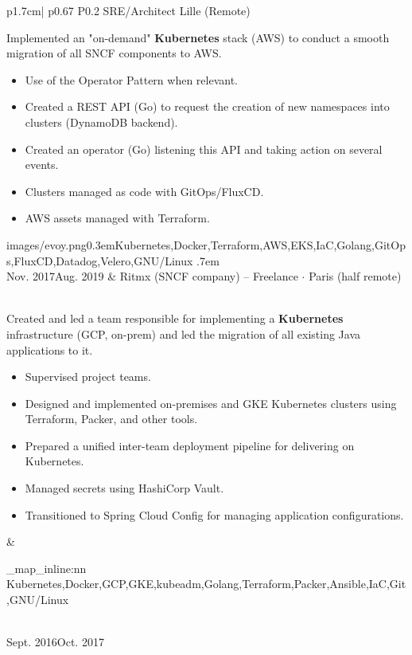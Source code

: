\documentclass[darkhipster]{hipstercv}
\newcommand{\cvtags}[1] {
    \clist_map_inline:nn { #1 }
    {
        \cvtag{##1} %
    }
}
\newcommand{\cveventdetailed}[9]{
    {\small #1} &
    {#2 $\cdot$ \small{{#4 ~\faMapMarker}}}\vspace{.5em}\newline
    {\color{black!70}\footnotesize #5\vspace{#9}} &
    {\raisebox{-0.7\height}{\texttt{[image: \#6]}}} \vspace{#7}
    {\par \small \cvtags{#8}}
}
\begin{document}
\begin{longtable}{p{1.7cm}| p{} P{0.2\textwidth}}
        {SRE/Architect}
        {Lille (Remote)\color{cvred}}
        {
            Implemented an "on-demand" {\bfseries Kubernetes} stack (AWS) to conduct a smooth migration of all SNCF components to AWS.
            \begin{itemize}
                \item Use of the Operator Pattern when relevant.
                \item Created a REST API (Go) to request the creation of new namespaces into clusters (DynamoDB backend).
                \item Created an operator (Go) listening this API and taking action on several events.
                \item Clusters managed as code with GitOps/FluxCD.
                \item AWS assets managed with Terraform.
            \end{itemize}
        }
        {images/evoy.png}{0.3em}{Kubernetes,Docker,Terraform,AWS,EKS,IaC,Golang,GitOps,FluxCD,Datadog,Velero,GNU/Linux}
        {.7em} \\
    \cveventdetailed
        {Nov. 2017\newline Aug. 2019}
        {Ritmx (SNCF company) -- Freelance}
        {SRE/Architect}
        {Paris (half remote)\color{cvred}}
        {
            Created and led a team responsible for implementing a {\bfseries Kubernetes} infrastructure (GCP, on-prem) and led the migration of all existing Java applications to it.
            \begin{itemize}
                \item Supervised project teams.
                \item Designed and implemented on-premises and GKE Kubernetes clusters using Terraform, Packer, and other tools.
                \item Prepared a unified inter-team deployment pipeline for delivering on Kubernetes.
                \item Managed secrets using HashiCorp Vault.
                \item Transitioned to Spring Cloud Config for managing application configurations.
            \end{itemize}
        }
        {images/ritmx.png}{1.1em}{Kubernetes,Docker,GCP,GKE,kubeadm,Golang,Terraform,Packer,Ansible,IaC,Git,GNU/Linux}
        {.7em} \\
    \cveventdetailed
        {Sept. 2016\newline Oct. 2017}

\end{longtable}
\end{document}

